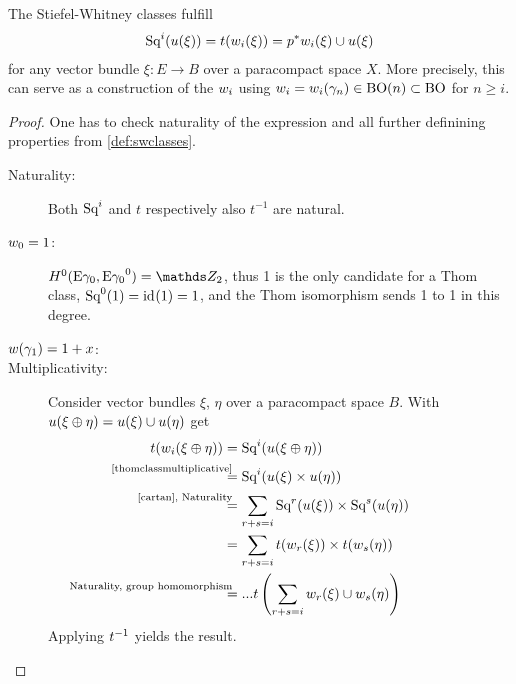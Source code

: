 \begin{Thm}
  The Stiefel-Whitney classes fulfill
  \begin{gather*}
    \text{Sq}^{i}(u(\xi)) = t(w_i(\xi)) = {p}^* w_i(\xi) \cup u(\xi)
  \end{gather*}
  for any vector bundle $\xi\colon E\to B$ over a paracompact space
  $X$.
  More precisely, this can serve as a construction of the $w_i$ using
  $w_i=w_i(\gamma_n)\in\text{BO}(n)\subset\text{BO}$ for $n\geq i$.
  \begin{proof}
    One has to check naturality of the expression and all further
    definining properties from \ref{def:swclasses}.
    \begin{description}
    \item[Naturality:] Both $\text{Sq}^{i}$ and $t$ respectively also $t^{-1}$
      are natural.
    \item[$w_0=1$:]
      $H^0(\thomspacepair{\E{\gamma_0}}) = \Zmod2$, thus 1 is the only
      candidate for a Thom class, $\text{Sq}^{0}(1) = \mathrm{id}_{}(1) = 1$, and the Thom
      isomorphism sends 1 to 1 in this degree.
    \item[$w(\gamma_1)=1+x$:] %
    \item[Multiplicativity:] %
      Consider vector bundles $\xi$, $\eta$ over a paracompact space
      $B$. With $u(\xi\oplus\eta)=u(\xi)\cup u(\eta)$ get
      \begin{align*} %
        \thomiso(\w_i(\xi\oplus\eta))
        &= \Sq i(\u(\xi\oplus\eta)) \\
        &\overset{\mathllap{\text{\autoref{thomclassmultiplicative}}}}=
        \Sq i(\u(\xi)\times\u(\eta)) \\
        &\overset{\mathllap{\text{\ref{cartan}, Naturality}}}=
          \sum_{r+s=i}\Sq r(\u(\xi)) \times \Sq s(\u(\eta)) \\
        &= \sum_{r+s=i}\thomiso(\w_r(\xi)) \times \thomiso(\w_s(\eta)) \\
        &\overset{\mathllap{\text{Naturality, group homomorphism}}}=
          ...
          \thomiso\left(\sum_{r+s=i}\w_r(\xi)\cup\w_s(\eta)\right)
      \end{align*}
      Applying $t^{-1}$ yields the result.
    \end{description}
  \end{proof}
\end{Thm}


